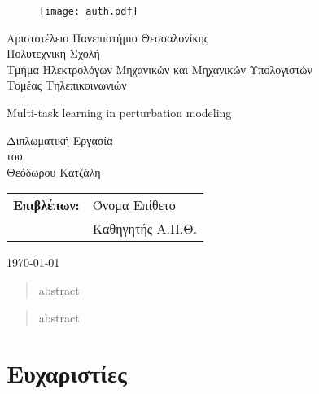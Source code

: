 \begin{titlepage}
    \begin{figure}[H]
      \begin{center}
        \texttt{[image: auth.pdf]}
        \label{fig:cover_auth_logo}
      \end{center}
    \end{figure}
    
    \centering
    \Large Αριστοτέλειο Πανεπιστήμιο Θεσσαλονίκης\\
    \Large Πολυτεχνική Σχολή\\
    \large Τμήμα Ηλεκτρολόγων Μηχανικών και Μηχανικών Υπολογιστών\\
    \large Τομέας Τηλεπικοινωνιών
    
    \vspace{\fill}
    
    \LARGE Multi-task learning in perturbation modeling
    
    \vspace{\fill}
    
    \Large Διπλωματική Εργασία\\
    \Large του\\
    \Large Θεόδωρου Κατζάλη
    
    \vspace{\fill}
    \raggedright
    
    \begin{tabular}{ll}
    \textbf{Επιβλέπων:} & Όνομα Επίθετο\\
     & Καθηγητής Α.Π.Θ.\\
    \end{tabular}
    
    \centering
    \vspace{\fill}
    \today
    
    \end{titlepage}
    
    \begin{abstract}
    abstract
    \end{abstract}
    
    \begin{abstract}
    abstract
    \end{abstract}
    
    \thispagestyle{empty}
    
    
    \section*{Ευχαριστίες}
    \thispagestyle{empty}
    
    
    
    \clearpage
    